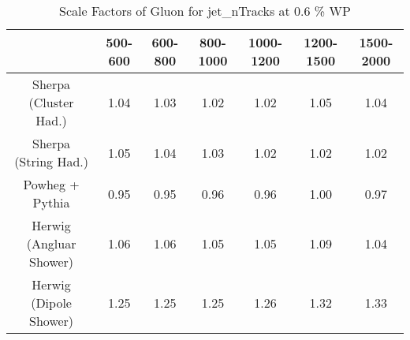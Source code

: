 \begin{table}
\centering
\caption{Scale Factors of Gluon for jet_nTracks at 0.6 \% WP}
\label{tab:SF_MC_jet_nTracks_0.6_Gluon}
\begin{tabular}{ccccccc}
\toprule
{} &  500-600 &  600-800 &  800-1000 &  1000-1200 &  1200-1500 &  1500-2000 \\
\midrule
Sherpa (Cluster Had.)   &     1.04 &     1.03 &      1.02 &       1.02 &       1.05 &       1.04 \\
Sherpa (String Had.)    &     1.05 &     1.04 &      1.03 &       1.02 &       1.02 &       1.02 \\
Powheg + Pythia         &     0.95 &     0.95 &      0.96 &       0.96 &       1.00 &       0.97 \\
Herwig (Angluar Shower) &     1.06 &     1.06 &      1.05 &       1.05 &       1.09 &       1.04 \\
Herwig (Dipole Shower)  &     1.25 &     1.25 &      1.25 &       1.26 &       1.32 &       1.33 \\
\bottomrule
\end{tabular}
\end{table}
